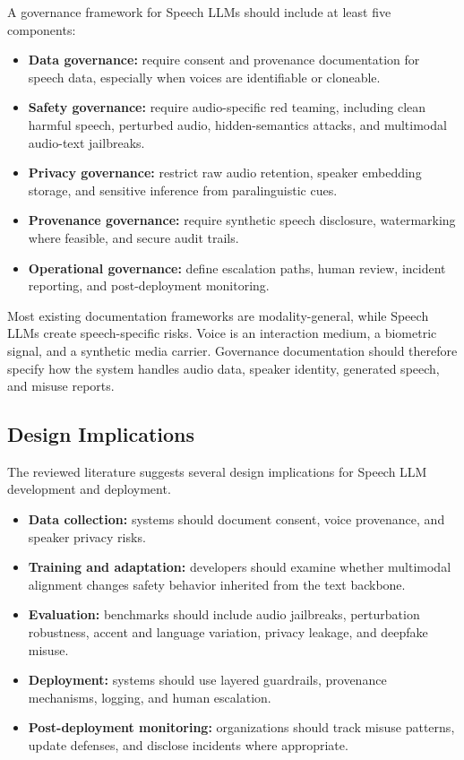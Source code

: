 A governance framework for Speech LLMs should include at least five components:

\begin{itemize}
\item \textbf{Data governance:} require consent and provenance documentation for speech data, especially when voices are identifiable or cloneable.
\item \textbf{Safety governance:} require audio-specific red teaming, including clean harmful speech, perturbed audio, hidden-semantics attacks, and multimodal audio-text jailbreaks.
\item \textbf{Privacy governance:} restrict raw audio retention, speaker embedding storage, and sensitive inference from paralinguistic cues.
\item \textbf{Provenance governance:} require synthetic speech disclosure, watermarking where feasible, and secure audit trails.
\item \textbf{Operational governance:} define escalation paths, human review, incident reporting, and post-deployment monitoring.
\end{itemize}

Most existing documentation frameworks are modality-general, while Speech LLMs create speech-specific risks. Voice is an interaction medium, a biometric signal, and a synthetic media carrier. Governance documentation should therefore specify how the system handles audio data, speaker identity, generated speech, and misuse reports.

\subsection{Design Implications}

The reviewed literature suggests several design implications for Speech LLM development and deployment.

\begin{itemize}
\item \textbf{Data collection:} systems should document consent, voice provenance, and speaker privacy risks.
\item \textbf{Training and adaptation:} developers should examine whether multimodal alignment changes safety behavior inherited from the text backbone.
\item \textbf{Evaluation:} benchmarks should include audio jailbreaks, perturbation robustness, accent and language variation, privacy leakage, and deepfake misuse.
\item \textbf{Deployment:} systems should use layered guardrails, provenance mechanisms, logging, and human escalation.
\item \textbf{Post-deployment monitoring:} organizations should track misuse patterns, update defenses, and disclose incidents where appropriate.
\end{itemize}

